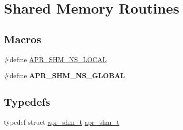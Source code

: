 \hypertarget{group__apr__shm}{}\section{Shared Memory Routines}
\label{group__apr__shm}
\subsection*{Macros}
\begin{DoxyCompactItemize}
\item 
\#define \hyperlink{group__apr__shm_ga47cc28ddc5f32cf904383b9e4f82825b}{A\+P\+R\+\_\+\+S\+H\+M\+\_\+\+N\+S\+\_\+\+L\+O\+C\+AL}
\item 
\#define {\bfseries A\+P\+R\+\_\+\+S\+H\+M\+\_\+\+N\+S\+\_\+\+G\+L\+O\+B\+AL}
\end{DoxyCompactItemize}
\subsection*{Typedefs}
\begin{DoxyCompactItemize}
\item 
typedef struct \hyperlink{group__apr__shm_ga79e8c16bdeaf7ade4ef0f935249e7c2f}{apr\+\_\+shm\+\_\+t} \hyperlink{group__apr__shm_ga79e8c16bdeaf7ade4ef0f935249e7c2f}{apr\+\_\+shm\+\_\+t}
\end{DoxyCompactItemize}
